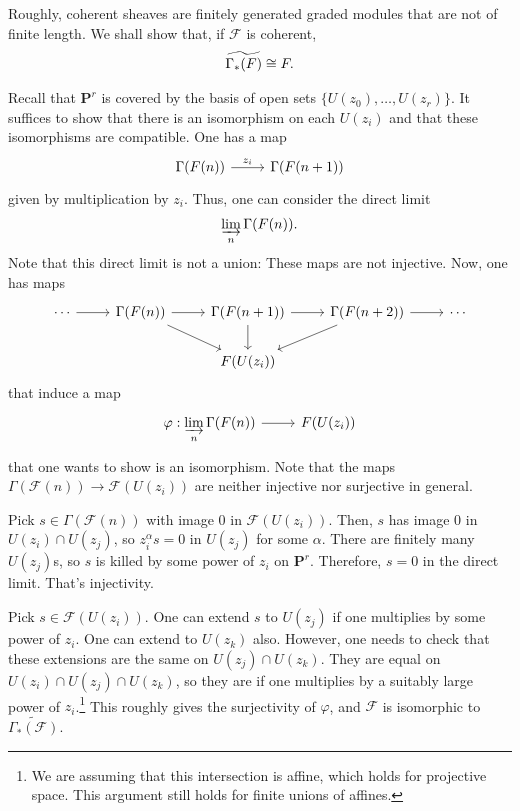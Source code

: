 \documentclass [11 pt, oneside] {article}
\begin{document}
Roughly, coherent sheaves are finitely generated graded modules that are not of finite length. We shall show that, if $\mathscr{F}$ is coherent,
\begin{align*}
	\widetilde{\Gamma_*(\mathscr{F}) } \isomto \mathscr{F}.
\end{align*}

Recall that $\mathbf{P}^r$ is covered by the basis of open sets $\{U(z_0),\hdots, U (z_r)\}$. It suffices to show that there is an isomorphism on each $U(z_i)$ and that these isomorphisms are compatible. One has a map
\[
\begin{tikzcd}
	\Gamma(\mathscr{F}(n)) \ar[r,"z_i"] &\Gamma(\mathscr{F}(n+1))
\end{tikzcd}
\]
given by multiplication by $z_i$. Thus, one can consider the direct limit
\begin{align*}
	\varinjlim_{n} \Gamma(\mathscr{F}(n)).
\end{align*}
Note that this direct limit is not a union: These maps are not injective. Now, one has maps
\[
\begin{tikzcd}
	\cdots \ar[r] & \Gamma(\mathscr{F}(n)) \ar[r]\ar[dr] & \Gamma(\mathscr{F}(n+1)) \ar[r]\ar[d] &\Gamma(\mathscr{F}(n+2)) \ar[r]\ar[dl] &\cdots\\
			      &&\mathscr{F}(U(z_i))
\end{tikzcd}
\]
that induce a map
\[
\begin{tikzcd}
	\varphi:\displaystyle\varinjlim_{n} \Gamma(\mathscr{F}(n))\ar[r]&\mathscr{F}(U(z_i))
\end{tikzcd}
\]
that one wants to show is an isomorphism. Note that the maps $\Gamma(\mathscr{F}(n))\longrightarrow \mathscr{F}(U(z_i))$ are neither injective nor surjective in general.

Pick $s\in \Gamma(\mathscr{F}(n))$ with image $0$ in $\mathscr{F}(U(z_i))$. Then, $s$ has image $0$ in $U(z_i)\cap U (z_j)$, so $z_i^\alpha s=0$ in $U(z_j)$ for some $\alpha$. There are finitely many $U(z_j)$s, so $s$ is killed by some power of $z_i$ on $\mathbf{P}^r$. Therefore, $s=0$ in the direct limit. That's injectivity.

Pick $s\in \mathscr{F}(U(z_i))$. One can extend $s$ to $U(z_j)$ if one multiplies by some power of $z_i$. One can extend to $U(z_k)$ also. However, one needs to check that these extensions are the same on $U(z_j)\cap U (z_k)$. They are equal on $U(z_i)\cap U (z_j)\cap U (z_k)$, so they are if one multiplies by a suitably large power of $z_i$.\footnote{We are assuming that this intersection is affine, which holds for projective space. This argument still holds for finite unions of affines.} This roughly gives the surjectivity of $\varphi$, and $\mathscr{F}$ is isomorphic to $\widetilde{\Gamma_*(\mathscr{F})}$. 
\end{document}

